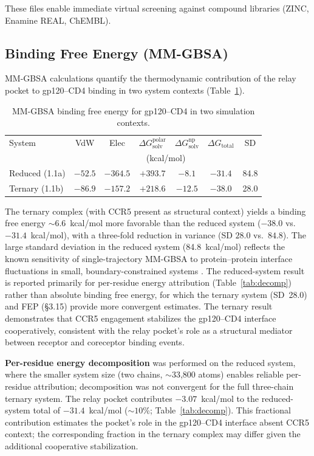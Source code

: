 \documentclass[11pt,a4paper]{article}
\begin{document}
These files enable immediate virtual screening against compound libraries (ZINC, Enamine REAL, ChEMBL).

\subsection{Binding Free Energy (MM-GBSA)}

MM-GBSA calculations quantify the thermodynamic contribution of the relay pocket to gp120--CD4 binding in two system contexts (Table~\ref{tab:mmpbsa}).

\begin{table}[htbp]
\centering
\caption{MM-GBSA binding free energy for gp120--CD4 in two simulation contexts.}
\label{tab:mmpbsa}
\small
\begin{tabular}{@{}lcccccc@{}}
\toprule
System & VdW & Elec & $\Delta G_\mathrm{solv}^\mathrm{polar}$ & $\Delta G_\mathrm{solv}^\mathrm{np}$ & $\Delta G_\mathrm{total}$ & SD \\
& \multicolumn{6}{c}{(kcal/mol)} \\
\midrule
Reduced (1.1a) & $-52.5$ & $-364.5$ & $+393.7$ & $-8.1$ & $\mathbf{-31.4}$ & 84.8 \\
Ternary (1.1b) & $-86.9$ & $-157.2$ & $+218.6$ & $-12.5$ & $\mathbf{-38.0}$ & 28.0 \\
\bottomrule
\end{tabular}
\end{table}

The ternary complex (with CCR5 present as structural context) yields a binding free energy ${\sim}6.6$~kcal/mol more favorable than the reduced system ($-38.0$ vs.\ $-31.4$~kcal/mol), with a three-fold reduction in variance (SD $28.0$ vs.\ $84.8$). The large standard deviation in the reduced system (84.8~kcal/mol) reflects the known sensitivity of single-trajectory MM-GBSA to protein--protein interface fluctuations in small, boundary-constrained systems \citep{Genheden2015,Hou2011}. The reduced-system result is reported primarily for per-residue energy attribution (Table~\ref{tab:decomp}) rather than absolute binding free energy, for which the ternary system (SD~28.0) and FEP (\S3.15) provide more convergent estimates. The ternary result demonstrates that CCR5 engagement stabilizes the gp120--CD4 interface cooperatively, consistent with the relay pocket's role as a structural mediator between receptor and coreceptor binding events.

\textbf{Per-residue energy decomposition} was performed on the reduced system, where the smaller system size (two chains, ${\sim}$33,800 atoms) enables reliable per-residue attribution; decomposition was not convergent for the full three-chain ternary system. The relay pocket contributes $-3.07$~kcal/mol to the reduced-system total of $-31.4$~kcal/mol (${\sim}10$\%; Table~\ref{tab:decomp}). This fractional contribution estimates the pocket's role in the gp120--CD4 interface absent CCR5 context; the corresponding fraction in the ternary complex may differ given the additional cooperative stabilization.
\end{document}
